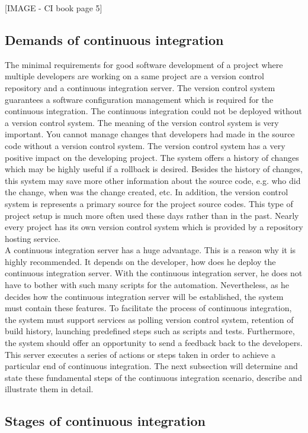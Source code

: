 [IMAGE - CI book page 5]

\subsection{Demands of continuous integration}
The minimal requirements for good software development of a project where multiple developers are working on a same project are a version control repository and a continuous integration server. The version control system guarantees a software configuration management which is required for the continuous integration. The continuous integration could not be deployed without a version control system. The meaning of the version control system is very important. You cannot manage changes that developers had made in the source code without a version control system. The version control system has a very positive impact on the developing project. The system offers a history of changes which may be highly useful if a rollback is desired. Besides the history of changes, this system may save more other information about the source code, e.g. who did the change, when was the change created, etc. In addition, the version control system is represents a primary source for the project source codes. This type of project setup is much more often used these days rather than in the past. Nearly every project has its own version control system which is provided by a repository hosting service.\\

A continuous integration server has a huge advantage. This is a reason why it is highly recommended. It depends on the developer, how does he deploy the continuous integration server. With the continuous integration server, he does not have to bother with such many scripts for the automation. Nevertheless, as he decides how the continuous integration server will be established, the system must contain these features. To facilitate the process of continuous integration, the system must support services as polling version control system, retention of build history, launching predefined steps such as scripts and tests. Furthermore, the system should offer an opportunity to send a feedback back to the developers. This server executes a series of actions or steps taken in order to achieve a particular end of continuous integration. The next subsection will determine and state these fundamental steps of the continuous integration scenario, describe and illustrate them in detail.

\subsection{Stages of continuous integration}

